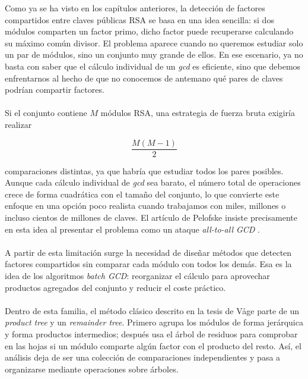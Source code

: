 Como ya se ha visto en los capítulos anteriores, la detección de factores compartidos entre claves públicas RSA se basa en una idea sencilla: si dos módulos comparten un factor primo, dicho factor puede recuperarse calculando su máximo común divisor. El problema aparece cuando no queremos estudiar solo un par de módulos, sino un conjunto muy grande de ellos. En ese escenario, ya no basta con saber que el cálculo individual de un \textit{gcd} es eficiente, sino que debemos enfrentarnos al hecho de que no conocemos de antemano qué pares de claves podrían compartir factores.
\\
\\
Si el conjunto contiene \(M\) módulos RSA, una estrategia de fuerza bruta exigiría realizar

\[
\frac{M(M-1)}{2}
\]

comparaciones distintas, ya que habría que estudiar todos los pares posibles. Aunque cada cálculo individual de \textit{gcd} sea barato, el número total de operaciones crece de forma cuadrática con el tamaño del conjunto, lo que convierte este enfoque en una opción poco realista cuando trabajamos con miles, millones o incluso cientos de millones de claves. El artículo de Pelofske insiste precisamente en esta idea al presentar el problema como un ataque \textit{all-to-all GCD} \citep{pelofske2024efficient}.
\\
\\
A partir de esta limitación surge la necesidad de diseñar métodos que detecten factores compartidos sin comparar cada módulo con todos los demás. Esa es la idea de los algoritmos \textit{batch GCD}: reorganizar el cálculo para aprovechar productos agregados del conjunto y reducir el coste práctico.
\\
\\
Dentro de esta familia, el método clásico descrito en la tesis de Våge parte de un \textit{product tree} y un \textit{remainder tree}. Primero agrupa los módulos de forma jerárquica y forma productos intermedios; después usa el árbol de residuos para comprobar en las hojas si un módulo comparte algún factor con el producto del resto. Así, el análisis deja de ser una colección de comparaciones independientes y pasa a organizarse mediante operaciones sobre árboles.


